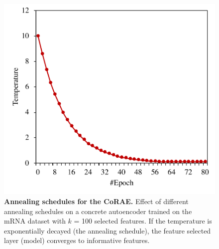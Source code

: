 \documentclass{bioinfo}
\begin{document}
\begin{figure}[hbt]
    \centering
    \includegraphics[scale=0.5]{fig/temp-epoch-mRNA.pdf}
    \caption{\textbf{Annealing schedules for the CoRAE.} Effect of different annealing schedules on a
concrete autoencoder trained on the mRNA dataset with $k$ = 100
selected features. If
the temperature is exponentially decayed (the annealing schedule), the feature selected layer (model) converges to informative features.}
    \label{fig:temp}
\end{figure}
\end{document}
